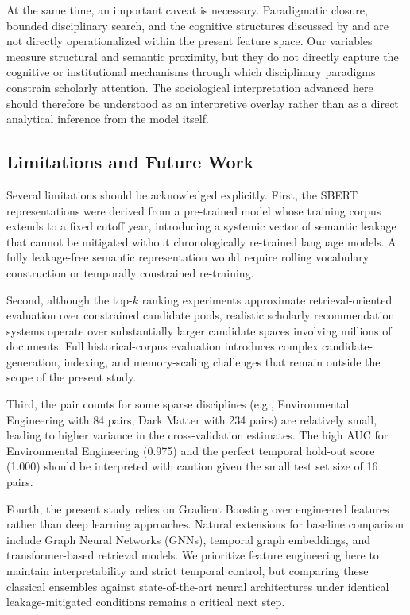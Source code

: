 \documentclass[11pt,a4paper]{article}
\begin{document}
At the same time, an important caveat is necessary. Paradigmatic closure, bounded disciplinary search, and the cognitive structures discussed by \citet{kuhn1962structure} and \citet{crane1972invisible} are not directly operationalized within the present feature space. Our variables measure structural and semantic proximity, but they do not directly capture the cognitive or institutional mechanisms through which disciplinary paradigms constrain scholarly attention. The sociological interpretation advanced here should therefore be understood as an interpretive overlay rather than as a direct analytical inference from the model itself.

\subsection{Limitations and Future Work}

Several limitations should be acknowledged explicitly. First, the SBERT representations were derived from a pre-trained model whose training corpus extends to a fixed cutoff year, introducing a systemic vector of semantic leakage that cannot be mitigated without chronologically re-trained language models. A fully leakage-free semantic representation would require rolling vocabulary construction or temporally constrained re-training.

Second, although the top-\(k\) ranking experiments approximate retrieval-oriented evaluation over constrained candidate pools, realistic scholarly recommendation systems operate over substantially larger candidate spaces involving millions of documents. Full historical-corpus evaluation introduces complex candidate-generation, indexing, and memory-scaling challenges that remain outside the scope of the present study.

Third, the pair counts for some sparse disciplines (e.g., Environmental Engineering with 84 pairs, Dark Matter with 234 pairs) are relatively small, leading to higher variance in the cross-validation estimates. The high AUC for Environmental Engineering (0.975) and the perfect temporal hold-out score (1.000) should be interpreted with caution given the small test set size of 16 pairs.

Fourth, the present study relies on Gradient Boosting over engineered features rather than deep learning approaches. Natural extensions for baseline comparison include Graph Neural Networks (GNNs), temporal graph embeddings, and transformer-based retrieval models. We prioritize feature engineering here to maintain interpretability and strict temporal control, but comparing these classical ensembles against state-of-the-art neural architectures under identical leakage-mitigated conditions remains a critical next step.
\end{document}

